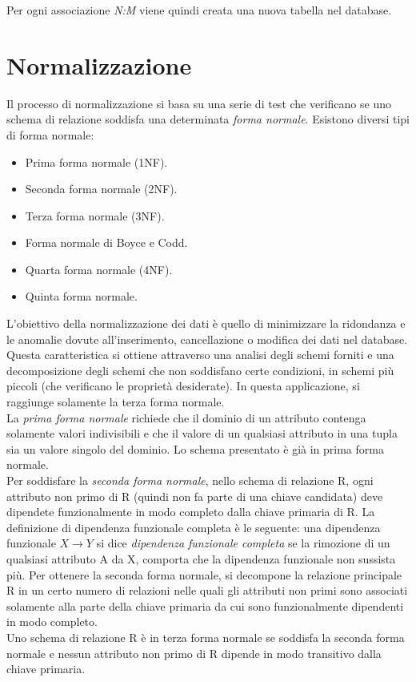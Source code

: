 \documentclass[paper=a4, fontsize=11pt,x11names]{report}
\begin{document}
Per ogni associazione \textit{N:M} viene quindi creata una nuova tabella nel database.

\chapter{Normalizzazione}
Il processo di normalizzazione si basa su una serie di test che verificano se uno schema di relazione soddisfa una determinata \textit{forma normale}. Esistono diversi tipi di forma normale:
\begin{itemize}
\item Prima forma normale (1NF).
\item Seconda forma normale (2NF).
\item Terza forma normale (3NF).
\item Forma normale di Boyce e Codd.
\item Quarta forma normale (4NF).
\item Quinta forma normale.
\end{itemize}
L'obiettivo della normalizzazione dei dati è quello di minimizzare la ridondanza e le anomalie dovute all'inserimento, cancellazione o modifica dei dati nel database. Questa caratteristica si ottiene attraverso una analisi degli schemi forniti e una decomposizione degli schemi che non soddisfano certe condizioni, in schemi più piccoli (che verificano le proprietà desiderate). In questa applicazione, si raggiunge solamente la terza forma normale.
\\
La \textit{prima forma normale} richiede che il dominio di un attributo contenga solamente valori indivisibili e che il valore di un qualsiasi attributo in una tupla sia un valore singolo del dominio. Lo schema presentato è già in prima forma normale.
\\
Per soddisfare la \textit{seconda forma normale}, nello schema di relazione R, ogni attributo non primo di R (quindi non fa parte di una chiave candidata) deve dipendete funzionalmente in modo completo dalla chiave primaria di R. La definizione di dipendenza funzionale completa è le seguente: una dipendenza funzionale $X \rightarrow Y$ si dice \textit{dipendenza funzionale completa} se la rimozione di un qualsiasi attributo A da X, comporta che la dipendenza funzionale non sussista più. Per ottenere la seconda forma normale, si decompone la relazione principale R in un certo numero di relazioni nelle quali gli attributi non primi sono associati solamente alla parte della chiave primaria da cui sono funzionalmente dipendenti in modo completo.
\\
Uno schema di relazione R è in terza forma normale se soddisfa la seconda forma normale e nessun attributo non primo di R dipende in modo transitivo dalla chiave primaria.
\end{document}

